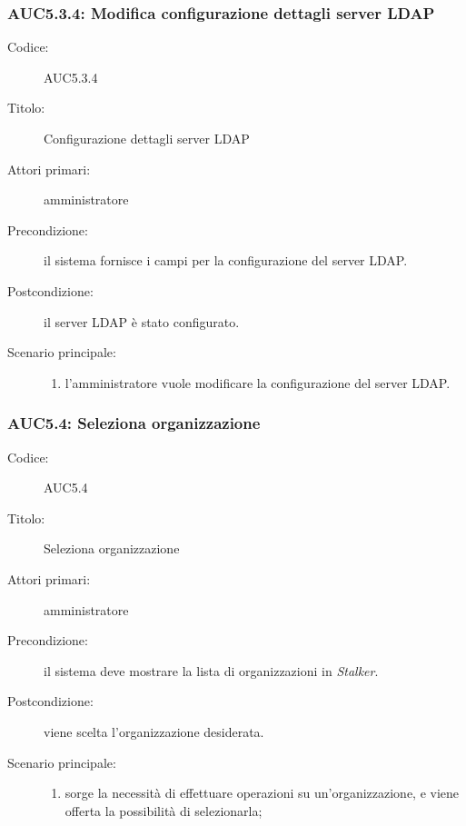 \documentclass[../../../analisi-dei-requisiti.tex]{subfiles}
\begin{document}
\subsubsection{AUC5.3.4: Modifica configurazione dettagli server LDAP}%
  \label{subs:AUC5.3.4}
  \begin{description}
    \item[Codice:] AUC5.3.4
    \item[Titolo:] Configurazione dettagli server LDAP
    \item[Attori primari:] amministratore
    \item[Precondizione:] il sistema fornisce i campi per la configurazione del server LDAP.
    \item[Postcondizione:] il server LDAP è stato configurato.
    \item[Scenario principale:]
    \begin{enumerate}
      \item l'amministratore vuole modificare la configurazione del server LDAP.
    \end{enumerate}
  \end{description}

\subsubsection{AUC5.4: Seleziona organizzazione}%
\label{subs:AUC5.4}
\begin{description}
  \item[Codice:] AUC5.4
  \item[Titolo:] Seleziona organizzazione
  \item[Attori primari:] amministratore
  \item[Precondizione:] il sistema deve mostrare la lista di organizzazioni in \emph{Stalker}.
  \item[Postcondizione:] viene scelta l'organizzazione desiderata.
  \item[Scenario principale:]
  \begin{enumerate}
    \item sorge la necessità di effettuare operazioni su un'organizzazione, e viene offerta la possibilità di selezionarla;
  \end{enumerate}
\end{description}
\end{document}
